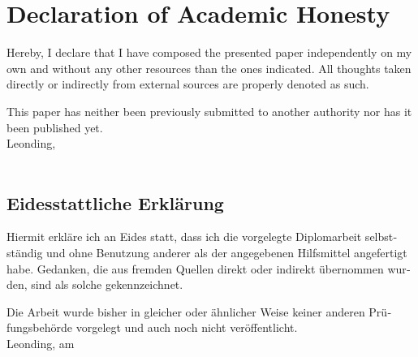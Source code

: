 \section*{Declaration of Academic Honesty}
Hereby, I declare that I have composed the presented paper independently on my own and without any other resources than the ones indicated. All thoughts taken directly or indirectly from external sources are properly denoted as such.

This paper has neither been previously submitted to another authority nor has it been published yet. \\[1em]
Leonding, \duedateen \\[5em]
\ifthenelse{\isundefined{\firstauthor}}{}{\firstauthor}
\ifthenelse{\isundefined{\secondauthor}}{}{\kern-1ex, \secondauthor}
\ifthenelse{\isundefined{\thirdauthor}}{}{\kern-1ex, \thirdauthor}
\ifthenelse{\isundefined{\fourthauthor}}{}{\kern-1ex, \fourthauthor} \\[5em]

\begin{otherlanguage}{german}
\section*{Eidesstattliche Erklärung}
Hiermit erkläre ich an Eides statt, dass ich die vorgelegte Diplomarbeit selbstständig und ohne Benutzung anderer als der angegebenen Hilfsmittel angefertigt habe. Gedanken, die aus fremden Quellen direkt oder indirekt übernommen wurden, sind als solche gekennzeichnet.

Die Arbeit wurde bisher in gleicher oder ähnlicher Weise keiner anderen Prüfungsbehörde vorgelegt und auch noch nicht veröffentlicht. \\[1em]
Leonding, am \duedatede \\[5em]
\ifthenelse{\isundefined{\firstauthor}}{}{\firstauthor}
\ifthenelse{\isundefined{\secondauthor}}{}{\kern-1ex, \secondauthor}
\ifthenelse{\isundefined{\thirdauthor}}{}{\kern-1ex, \thirdauthor}
\ifthenelse{\isundefined{\fourthauthor}}{}{\kern-1ex, \fourthauthor} \\[5em]
\end{otherlanguage}


